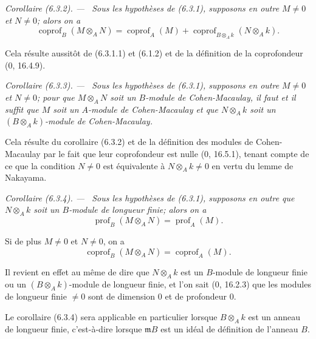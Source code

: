 \documentclass[10pt,oneside]{book}
\newcommand{\oldpage}[2][]{%
  \setcounter{footnote}{0}%
  \marginpar{\scriptsize\textbf{#1}~|~#2}\ignorespaces}
\newenvironment{corollary}[1][]{%
  \par\medskip\noindent\itshape Corollaire (#1). ---\ }{\par}
\begin{document}
\begin{corollary}[6.3.2]
\label{IV.2.s6.3.2-fr}
Sous les hypothèses de (6.3.1), supposons en outre $M\neq0$ et $N\neq0$;
alors on a
\begin{equation}
\operatorname{coprof}_B(M\otimes_AN)=\operatorname{coprof}_A(M)
+\operatorname{coprof}_{B\otimes_Ak}(N\otimes_Ak).
\tag{6.3.2.1}\label{IV.2.s6.3.2.1-fr}
\end{equation}
\end{corollary}

Cela résulte aussitôt de (6.3.1.1) et (6.1.2) et de la définition de la
coprofondeur (0, 16.4.9).

\begin{corollary}[6.3.3]
\label{IV.2.s6.3.3-fr}
Sous les hypothèses de (6.3.1), supposons en outre $M\neq0$ et $N\neq0$; pour
que $M\otimes_AN$ soit un $B$-module de Cohen-Macaulay, il faut et il suffit
que $M$ soit un $A$-module de Cohen-Macaulay et que $N\otimes_Ak$ soit un
$(B\otimes_Ak)$-module de Cohen-Macaulay.
\end{corollary}

Cela résulte du corollaire (6.3.2) et de la définition des modules de
Cohen-Macaulay par le fait que leur coprofondeur est nulle (0, 16.5.1), tenant
compte de ce que la condition $N\neq0$ est équivalente à $N\otimes_Ak\neq0$ en
vertu du lemme de Nakayama.

\begin{corollary}[6.3.4]
\label{IV.2.s6.3.4-fr}
Sous les hypothèses de (6.3.1), supposons en outre que $N\otimes_Ak$ soit un
$B$-module de longueur finie; alors on a
\begin{equation}
\operatorname{prof}_B(M\otimes_AN)=\operatorname{prof}_A(M).
\tag{6.3.4.1}\label{IV.2.s6.3.4.1-fr}
\end{equation}

\oldpage[IV-2]{140}

Si de plus $M\neq0$ et $N\neq0$, on a
\begin{equation}
\operatorname{coprof}_B(M\otimes_AN)=\operatorname{coprof}_A(M).
\tag{6.3.4.2}\label{IV.2.s6.3.4.2-fr}
\end{equation}
\end{corollary}

Il revient en effet au même de dire que $N\otimes_Ak$ est un $B$-module de
longueur finie ou un $(B\otimes_Ak)$-module de longueur finie, et l'on sait
(0, 16.2.3) que les modules de longueur finie $\neq0$ sont de dimension $0$ et
de profondeur $0$.

Le corollaire (6.3.4) sera applicable en particulier lorsque $B\otimes_Ak$ est
un anneau de longueur finie, c'est-à-dire lorsque $\mathfrak mB$ est un idéal
de définition de l'anneau $B$.
\end{document}
